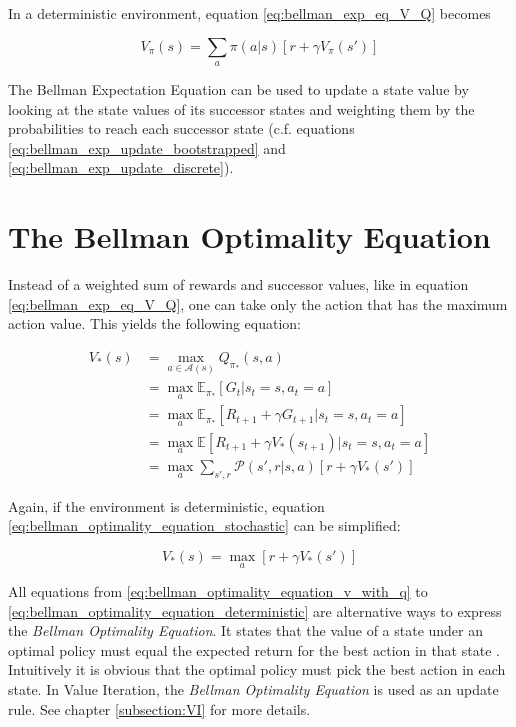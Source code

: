 In a deterministic environment, equation \ref{eq:bellman_exp_eq_V_Q} becomes

\begin{equation}
V_\pi(s)= \sum_a \pi(a|s)[r+\gamma V_{\pi}(s')]
\label{eq:bellman_exp_eq_V_determinisic}
\end{equation}

The Bellman Expectation Equation can be used to update a state value by looking at the state values of its successor states and weighting them by the probabilities to reach each successor state (c.f. equations \ref{eq:bellman_exp_update_bootstrapped} and \ref{eq:bellman_exp_update_discrete}).

\section{The Bellman Optimality Equation}

Instead of a weighted sum of rewards and successor values, like in equation \ref{eq:bellman_exp_eq_V_Q}, one can take only the action that has the maximum action value. This yields the following equation:

\begin{align}
V_*(s)&=\max_{a \in \mathcal{A}(s)} Q_{\pi_*}(s,a) \label{eq:bellman_optimality_equation_v_with_q}\\
&=\max_{a}\mathbb{E}_{\pi_*}[G_t|s_t=s,a_t=a]\\
&=\max_{a}\mathbb{E}_{\pi_*}[R_{t+1} + \gamma G_{t+1}|s_t=s,a_t=a]\\
&=\max_{a}\mathbb{E}[R_{t+1} + \gamma V_*(s_{t+1})|s_t=s,a_t=a]\\
&=\max_{a}\sum_{s',r}\mathcal{P}(s',r|s,a)[r + \gamma V_*(s')]
\label{eq:bellman_optimality_equation_stochastic}
\end{align}

Again, if the environment is deterministic, equation \ref{eq:bellman_optimality_equation_stochastic} can be simplified:

\begin{equation}
V_*(s) = \max_a[r+\gamma V_*(s')]
\label{eq:bellman_optimality_equation_deterministic}
\end{equation}

All equations from \ref{eq:bellman_optimality_equation_v_with_q} to \ref{eq:bellman_optimality_equation_deterministic} are alternative ways to express the \textit{Bellman Optimality Equation}. It states that the value of a state under an optimal policy must equal the expected return for the best action in that state \cite{SuttonBarto2018}. Intuitively it is obvious that the optimal policy must pick the best action in each state. In Value Iteration, the \textit{Bellman Optimality Equation} is used as an update rule. See chapter \ref{subsection:VI} for more details.